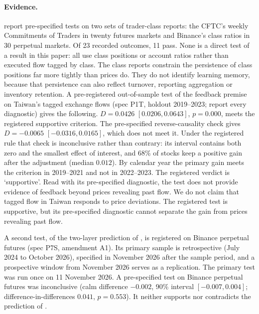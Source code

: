 \documentclass[12pt]{article}
\theoremstyle{definition}
\theoremstyle{remark}
\begin{document}
\paragraph{Evidence.} \citet{niroula2026a} report pre-specified tests on two sets of trader-class reports: the CFTC's weekly Commitments of Traders in twenty futures markets and Binance's class ratios in 30 perpetual markets. Of 23 recorded outcomes, 11 pass. None is a direct test of a result in this paper: all use class positions or account ratios rather than executed flow tagged by class. The class reports constrain the persistence of class positions far more tightly than prices do. They do not identify learning memory, because that persistence can also reflect turnover, reporting aggregation or inventory retention. A pre-registered out-of-sample test of the feedback premise on Taiwan's tagged exchange flows (spec P1T, holdout 2019--2023; \citet{niroula2026a} report every diagnostic) gives the following. $D=0.0426$ $[0.0206, 0.0643]$, $p=0.000$, meets the registered supportive criterion. The pre-specified reverse-causality check gives $D=-0.0065$ $[-0.0316, 0.0165]$, which does not meet it. Under the registered rule that check is inconclusive rather than contrary: its interval contains both zero and the smallest effect of interest, and 68\% of stocks keep a positive gain after the adjustment (median $0.012$). By calendar year the primary gain meets the criterion in 2019--2021 and not in 2022--2023. The registered verdict is `supportive'. Read with its pre-specified diagnostic, the test does not provide evidence of feedback beyond prices revealing past flow. We do not claim that tagged flow in Taiwan responds to price deviations. The registered test is supportive, but its pre-specified diagnostic cannot separate the gain from prices revealing past flow.

A second test, of the two-layer prediction of \citet[Section~S6]{niroula2026full}, is registered on Binance perpetual futures (spec P7S, amendment A1). Its primary sample is retrospective (July 2024 to October 2026), specified in November 2026 after the sample period, and a prospective window from November 2026 serves as a replication. The primary test was run once on 11 November 2026. A pre-specified test on Binance perpetual futures was inconclusive (calm difference $-0.002$, 90\% interval $[-0.007, 0.004]$; difference-in-differences $0.041$, $p=0.553$). It neither supports nor contradicts the prediction of \citet[Section~S6]{niroula2026full}.
\end{document}
